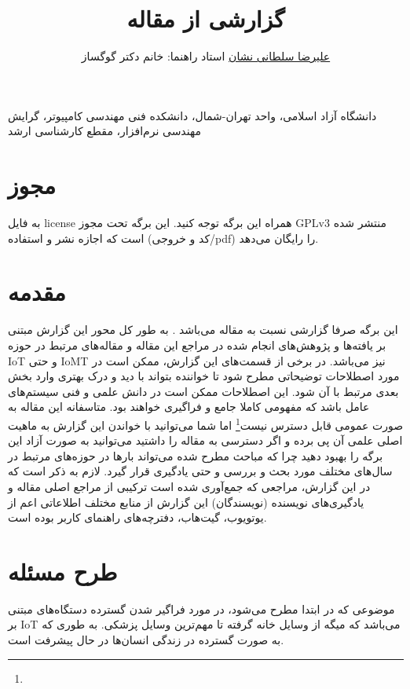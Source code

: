 \documentclass[10pt, a4paper]{article}
\title{گزارشی از مقاله \lr{Reliable Real-Time Operating System for IoT Devices}}
\author{\href{mailto:a.soltani@iau-tnb.ac.ir}{علیرضا سلطانی نشان} \small{استاد
راهنما: خانم دکتر گوگساز}}
\begin{document}
\maketitle

دانشگاه آزاد اسلامی، واحد تهران-شمال، دانشکده فنی مهندسی کامپیوتر، گرایش مهندسی
نرم‌افزار، مقطع کارشناسی ارشد

\tableofcontents

\section{مجوز}

به فایل license همراه این برگه توجه کنید. این برگه تحت مجوز GPLv3 منتشر شده است
که اجازه نشر و استفاده (کد و خروجی/pdf) را رایگان می‌دهد.

\section{مقدمه}

این برگه صرفا گزارشی نسبت به مقاله  می‌باشد \cite{hahm2020reliable}. به طور کل محور این گزارش مبتنی بر
یافته‌ها و پژوهش‌های انجام شده در مراجع این مقاله و مقاله‌های مرتبط در حوزه IoT
و حتی IoMT نیز می‌باشد. در برخی از قسمت‌های این گزارش، ممکن است در مورد اصطلاحات
توضیحاتی مطرح شود تا خواننده بتواند با دید و درک بهتری وارد بخش بعدی مرتبط با آن
شود. این اصطلاحات ممکن است در دانش علمی و فنی سیستم‌های عامل باشد که مفهومی
کاملا جامع و فراگیری خواهند بود. متاسفانه این مقاله به صورت عمومی قابل دسترس
نیست\footnote{} اما شما می‌توانید با خواندن این گزارش به ماهیت
اصلی علمی آن پی برده و اگر دسترسی به مقاله را داشتید می‌توانید به صورت آزاد این
برگه را بهبود دهید چرا که مباحث مطرح شده می‌تواند بار‌ها در حوزه‌های مرتبط در
سال‌های مختلف مورد بحث و بررسی و حتی یادگیری قرار گیرد. لازم به ذکر است که در
این گزارش، مراجعی که جمع‌آوری شده است ترکیبی از مراجع اصلی مقاله و یادگیری‌های
نویسنده (نویسندگان) این گزارش از منابع مختلف اطلاعاتی اعم از یوتویوب، گیت‌هاب،
دفترچه‌های راهنمای کاربر بوده است.

\section{طرح مسئله}

موضوعی که در ابتدا مطرح می‌شود، در مورد فراگیر شدن گسترده دستگاه‌های مبتنی بر
IoT می‌باشد که میگه از وسایل خانه گرفته تا مهم‌ترین وسایل پزشکی. به طوری که به
صورت گسترده در زندگی انسان‌ها در حال پیشرفت است.
\end{document}
